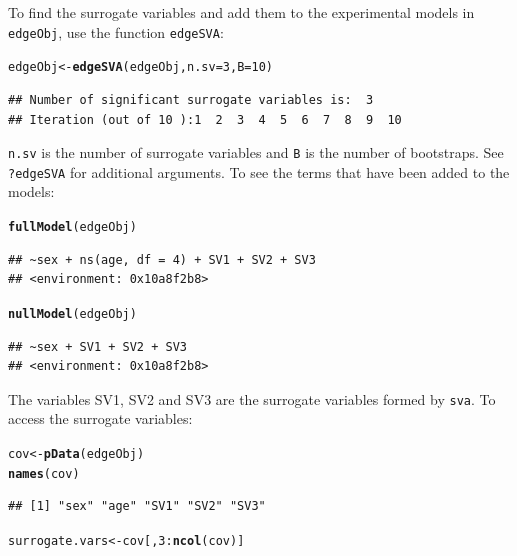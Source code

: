 \documentclass{article}\usepackage[]{graphicx}\usepackage[]{color}
\makeatletter
\newcommand{\hlnum}[1]{\textcolor[rgb]{0.686,0.059,0.569}{#1}}%
\newcommand{\hlopt}[1]{\textcolor[rgb]{0,0,0}{#1}}%
\newcommand{\hlstd}[1]{\textcolor[rgb]{0.345,0.345,0.345}{#1}}%
\newcommand{\hlkwb}[1]{\textcolor[rgb]{0.69,0.353,0.396}{#1}}%
\newcommand{\hlkwc}[1]{\textcolor[rgb]{0.333,0.667,0.333}{#1}}%
\newcommand{\hlkwd}[1]{\textcolor[rgb]{0.737,0.353,0.396}{\textbf{#1}}}%
\newenvironment{kframe}{%
 \def\at@end@of@kframe{}%
 \ifinner\ifhmode%
  \def\at@end@of@kframe{\end{minipage}}%
  \begin{minipage}{\columnwidth}%
 \fi\fi%
 \def\FrameCommand##1{\hskip\@totalleftmargin \hskip-\fboxsep
 \colorbox{shadecolor}{##1}\hskip-\fboxsep
     \hskip-\linewidth \hskip-\@totalleftmargin \hskip\columnwidth}%
 \MakeFramed {\advance\hsize-\width
   \@totalleftmargin\z@ \linewidth\hsize
   \@setminipage}}%
 {\par\unskip\endMakeFramed%
 \at@end@of@kframe}
\newenvironment{knitrout}{}{} %
\makeatother
\begin{document}
To find the surrogate variables and add them to the experimental models in {\tt edgeObj}, use the function {\tt edgeSVA}:
\begin{knitrout}
\color{fgcolor}\begin{kframe}
\begin{alltt}
\hlstd{edgeObj} \hlkwb{<-} \hlkwd{edgeSVA}\hlstd{(edgeObj,} \hlkwc{n.sv} \hlstd{=} \hlnum{3}\hlstd{,} \hlkwc{B} \hlstd{=} \hlnum{10}\hlstd{)}
\end{alltt}
\begin{verbatim}
## Number of significant surrogate variables is:  3 
## Iteration (out of 10 ):1  2  3  4  5  6  7  8  9  10
\end{verbatim}
\end{kframe}
\end{knitrout}
{\tt n.sv} is the number of surrogate variables and {\tt B} is the number of bootstraps. See {\tt ?edgeSVA} for additional arguments. To see the terms that have been added to the models:
\begin{knitrout}
\color{fgcolor}\begin{kframe}
\begin{alltt}
\hlkwd{fullModel}\hlstd{(edgeObj)}
\end{alltt}
\begin{verbatim}
## ~sex + ns(age, df = 4) + SV1 + SV2 + SV3
## <environment: 0x10a8f2b8>
\end{verbatim}
\begin{alltt}
\hlkwd{nullModel}\hlstd{(edgeObj)}
\end{alltt}
\begin{verbatim}
## ~sex + SV1 + SV2 + SV3
## <environment: 0x10a8f2b8>
\end{verbatim}
\end{kframe}
\end{knitrout}
The variables SV1, SV2 and SV3 are the surrogate variables formed by {\tt sva}. To access the surrogate variables:
\begin{knitrout}
\color{fgcolor}\begin{kframe}
\begin{alltt}
\hlstd{cov} \hlkwb{<-} \hlkwd{pData}\hlstd{(edgeObj)}
\hlkwd{names}\hlstd{(cov)}
\end{alltt}
\begin{verbatim}
## [1] "sex" "age" "SV1" "SV2" "SV3"
\end{verbatim}
\begin{alltt}
\hlstd{surrogate.vars} \hlkwb{<-} \hlstd{cov[,} \hlnum{3}\hlopt{:}\hlkwd{ncol}\hlstd{(cov)]}
\end{alltt}
\end{kframe}
\end{knitrout}
\end{document}
